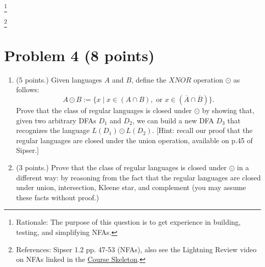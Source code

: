 \documentclass[letterpaper,11pt,twoside]{article}
\theoremstyle{plain}
\theoremstyle{definition}
\theoremstyle{remark}
\theoremstyle{restate}
\newcommand\blfootnote[1]{%
  \begingroup
  \renewcommand\thefootnote{}\footnote{#1}%
  \addtocounter{footnote}{-1}%
  \endgroup
}
\begin{document}
\begin{enumerate}
\begin{center}
    \end{center}

    
\end{enumerate}

\blfootnote{Rationale: The purpose of this question is to get experience in building, testing, and simplifying NFAs. }
\blfootnote{References: Sipser 1.2 pp. 47-53 (NFAs), also see the Lightning Review video on NFAs linked in the \href{https://docs.google.com/document/d/1PHCNkMitYsMpbh-sxrBmr-cGbpUEshfdFDS2k09fHrI}{Course Skeleton}. }

\clearpage
\section{Problem 4 (8 points)}

\begin{enumerate}
    \item (5 points.) Given languages $A$ and $B$, define the $XNOR$ operation $\odot$ as follows:
    \[
        A \odot B := \{x \; | \; x \in (A \cap B), \text{ or } x \in (\overline{A} \cap \overline{B})\}.
    \]
    Prove that the class of regular languages is closed under $\odot$ by showing that, given two arbitrary DFAs $D_1$ and $D_2$, we can build a new DFA $D_3$ that recognizes the language $L(D_1) \odot L(D_2)$. [Hint: recall our proof that the regular languages are closed under the union operation, available on p.45 of Sipser.]
    
    
    \item (3 points.) Prove that the class of regular languages is closed under $\odot$ in a different way: by reasoning from the fact that the regular languages are closed under union, intersection, Kleene star, and complement (you may assume these facts without proof.)
\end{enumerate}
\end{document}
